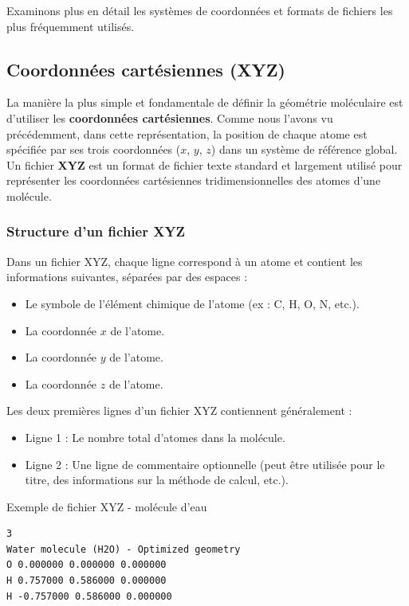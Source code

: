\documentclass[12pt,a4paper]{article} %
\numberwithin{equation}{section} %
\numberwithin{figure}{section} %
\numberwithin{table}{section} %
\begin{document}
Examinons plus en détail les systèmes de coordonnées et formats de fichiers les plus fréquemment utilisés.

\subsection{Coordonnées cartésiennes (XYZ)}

La manière la plus simple et fondamentale de définir la géométrie moléculaire est d'utiliser les \textbf{coordonnées cartésiennes}. Comme nous l'avons vu précédemment, dans cette représentation, la position de chaque atome est spécifiée par ses trois coordonnées ($x$, $y$, $z$) dans un système de référence global. Un fichier \textbf{XYZ} est un format de fichier texte standard et largement utilisé pour représenter les coordonnées cartésiennes tridimensionnelles des atomes d'une molécule.

\subsubsection{Structure d'un fichier XYZ}

Dans un fichier XYZ, chaque ligne correspond à un atome et contient les informations suivantes, séparées par des espaces :

\begin{itemize}
 \item Le symbole de l'élément chimique de l'atome (ex : C, H, O, N, etc.).
 \item La coordonnée $x$ de l'atome.
 \item La coordonnée $y$ de l'atome.
 \item La coordonnée $z$ de l'atome.
\end{itemize}
Les deux premières lignes d'un fichier XYZ contiennent généralement :

\begin{itemize}
 \item Ligne 1 : Le nombre total d'atomes dans la molécule.
 \item Ligne 2 : Une ligne de commentaire optionnelle (peut être utilisée pour le titre, des informations sur la méthode de calcul, etc.).
\end{itemize}

\begin{example}{Exemple de fichier XYZ - molécule d'eau }{}

\begin{verbatim}
3
Water molecule (H2O) - Optimized geometry
O 0.000000 0.000000 0.000000
H 0.757000 0.586000 0.000000
H -0.757000 0.586000 0.000000
\end{verbatim}
\end{example}
\end{document}
